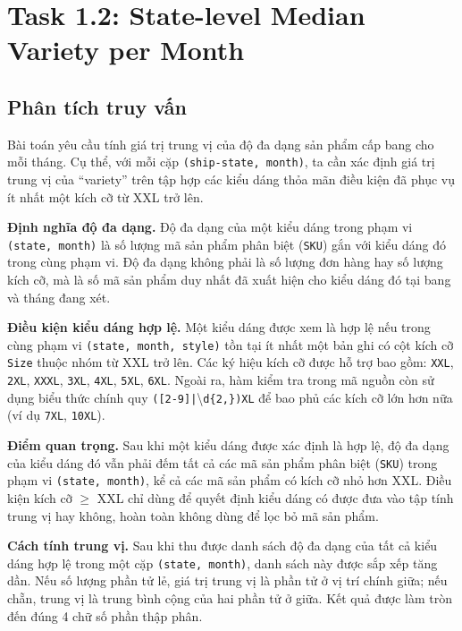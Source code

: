\section{Task 1.2: State-level Median Variety per Month}

\subsection{Phân tích truy vấn}
Bài toán yêu cầu tính giá trị trung vị của độ đa dạng sản phẩm cấp bang cho mỗi tháng. Cụ thể, với mỗi cặp \texttt{(ship-state, month)}, ta cần xác định giá trị trung vị của ``variety'' trên tập hợp các kiểu dáng thỏa mãn điều kiện đã phục vụ ít nhất một kích cỡ từ XXL trở lên.

\textbf{Định nghĩa độ đa dạng.} Độ đa dạng của một kiểu dáng trong phạm vi \texttt{(state, month)} là số lượng mã sản phẩm phân biệt (\texttt{SKU}) gắn với kiểu dáng đó trong cùng phạm vi. Độ đa dạng không phải là số lượng đơn hàng hay số lượng kích cỡ, mà là số mã sản phẩm duy nhất đã xuất hiện cho kiểu dáng đó tại bang và tháng đang xét.

\textbf{Điều kiện kiểu dáng hợp lệ.} Một kiểu dáng được xem là hợp lệ nếu trong cùng phạm vi \texttt{(state, month, style)} tồn tại ít nhất một bản ghi có cột kích cỡ \texttt{Size} thuộc nhóm từ XXL trở lên. Các ký hiệu kích cỡ được hỗ trợ bao gồm: \texttt{XXL}, \texttt{2XL}, \texttt{XXXL}, \texttt{3XL}, \texttt{4XL}, \texttt{5XL}, \texttt{6XL}. Ngoài ra, hàm kiểm tra trong mã nguồn còn sử dụng biểu thức chính quy \texttt{([2-9]|}\textbackslash\texttt{d\{2,\})XL} để bao phủ các kích cỡ lớn hơn nữa (ví dụ \texttt{7XL}, \texttt{10XL}).

\textbf{Điểm quan trọng.} Sau khi một kiểu dáng được xác định là hợp lệ, độ đa dạng của kiểu dáng đó vẫn phải đếm tất cả các mã sản phẩm phân biệt (\texttt{SKU}) trong phạm vi \texttt{(state, month)}, kể cả các mã sản phẩm có kích cỡ nhỏ hơn XXL. Điều kiện kích cỡ $\geq$ XXL chỉ dùng để quyết định kiểu dáng có được đưa vào tập tính trung vị hay không, hoàn toàn không dùng để lọc bỏ mã sản phẩm.

\textbf{Cách tính trung vị.} Sau khi thu được danh sách độ đa dạng của tất cả kiểu dáng hợp lệ trong một cặp \texttt{(state, month)}, danh sách này được sắp xếp tăng dần. Nếu số lượng phần tử lẻ, giá trị trung vị là phần tử ở vị trí chính giữa; nếu chẵn, trung vị là trung bình cộng của hai phần tử ở giữa. Kết quả được làm tròn đến đúng 4 chữ số phần thập phân.

